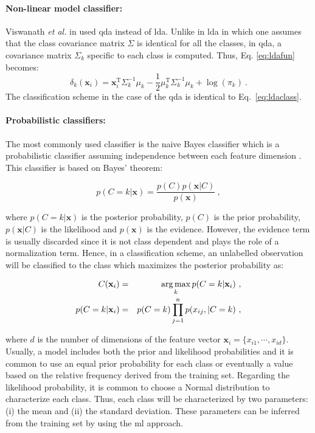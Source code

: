 \paragraph{Non-linear model classifier:}
Viswanath \textit{et al.} in \cite{Viswanath2012} used \acf{qda} instead of \ac{lda}.
Unlike in \ac{lda} in which one assumes that the class covariance matrix $\Sigma$ is identical for all the classes, in \ac{qda}, a covariance matrix $\Sigma_k$ specific to each class is computed.
Thus, Eq. \eqref{eq:ldafun} becomes:
\begin{equation}
	\delta_{k}(\mathbf{x}_i) = \mathbf{x}_i^{\text{T}} \Sigma_{k}^{-1} \mu_k - \frac{1}{2} \mu_{k}^{\text{T}} \Sigma_{k}^{-1} \mu_k + \log (\pi_k) \ .
	\label{eq:qdafun}
\end{equation}
The classification scheme in the case of the \ac{qda} is identical to Eq.~\eqref{eq:ldaclass}.


\paragraph{Probabilistic classifiers:}
The most commonly used classifier is the naive Bayes classifier which is a probabilistic classifier assuming independence between each feature dimension \cite{Rish2001}.
This classifier is based on Bayes' theorem:

\begin{equation}
	p(C=k|\mathbf{x}) = \frac{p(C)p(\mathbf{x}|C)}{p(\mathbf{x})} \ ,
	\label{eq:bayth}
\end{equation}

\noindent where $p(C=k|\mathbf{x})$ is the posterior probability, $p(C)$ is the prior probability, $p(\mathbf{x}|C)$ is the likelihood and $p(\mathbf{x})$ is the evidence. 
However, the evidence term is usually discarded since it is not class dependent and plays the role of a normalization term.
Hence, in a classification scheme, an unlabelled observation will be classified to the class which maximizes the posterior probability as:

\begin{eqnarray}
	C(\mathbf{x}_i) & = & \operatorname*{arg\,max}_k p(C=k|\mathbf{x}_i) \ , \label{eq:maxbay} \\
	p(C=k|\mathbf{x}_i) & = & p(C=k) \prod_{j=1}^{n} p(x_{ij},|C=k) \ , \label{eq:postbay}
\end{eqnarray}

\noindent where $d$ is the number of dimensions of the feature vector $\mathbf{x}_i = \{x_{i1},\cdots,x_{id}\}$.
Usually, a model includes both the prior and likelihood probabilities and it is common to use an equal prior probability for each class or eventually a value based on the relative frequency derived from the training set.
Regarding the likelihood probability, it is common to choose a Normal distribution to characterize each class.
Thus, each class will be characterized by two parameters: (i) the mean and (ii) the standard deviation.
These parameters can be inferred from the training set by using the \ac{ml} approach.

